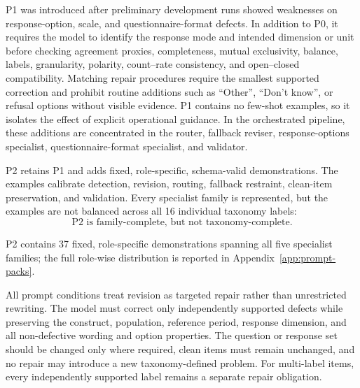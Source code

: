 \documentclass[11pt,a4paper]{article}
\begin{document}
P1 was introduced after preliminary development runs showed weaknesses on
response-option, scale, and questionnaire-format defects. In addition to P0,
it requires the model to identify the response mode and intended dimension or
unit before checking agreement proxies, completeness, mutual exclusivity,
balance, labels, granularity, polarity, count--rate consistency, and
open--closed compatibility. Matching repair procedures require the smallest
supported correction and prohibit routine additions such as ``Other'',
``Don't know'', or refusal options without visible evidence. P1 contains no
few-shot examples, so it isolates the effect of explicit operational guidance.
In the orchestrated pipeline, these additions are concentrated in the router,
fallback reviser, response-options specialist, questionnaire-format specialist,
and validator.

P2 retains P1 and adds fixed, role-specific, schema-valid demonstrations. The
examples calibrate detection, revision, routing, fallback restraint, clean-item
preservation, and validation. Every specialist family is represented, but the
examples are not balanced across all 16 individual taxonomy labels:
\[
    \boxed{\text{P2 is family-complete, but not taxonomy-complete.}}
\]

P2 contains 37 fixed, role-specific demonstrations spanning all five specialist
families; the full role-wise distribution is reported in
Appendix~\ref{app:prompt-packs}.

All prompt conditions treat revision as targeted repair rather than unrestricted
rewriting. The model must correct only independently supported defects while
preserving the construct, population, reference period, response dimension, and
all non-defective wording and option properties. The question or response set
should be changed only where required, clean items must remain unchanged, and no
repair may introduce a new taxonomy-defined problem. For multi-label items,
every independently supported label remains a separate repair obligation.
\end{document}
